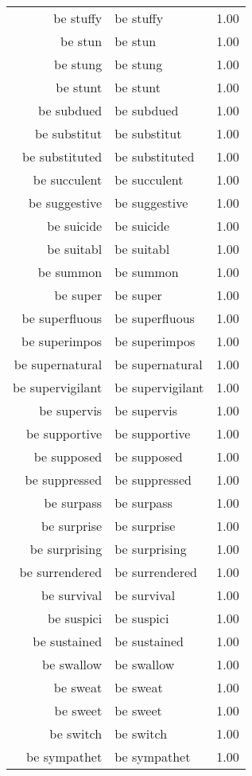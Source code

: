 \begin{table}[ht]
\begin{tabular}{rlr}
  be stuffy & be stuffy & 1.00 \\ 
  be stun & be stun & 1.00 \\ 
  be stung & be stung & 1.00 \\ 
  be stunt & be stunt & 1.00 \\ 
  be subdued & be subdued & 1.00 \\ 
  be substitut & be substitut & 1.00 \\ 
  be substituted & be substituted & 1.00 \\ 
  be succulent & be succulent & 1.00 \\ 
  be suggestive & be suggestive & 1.00 \\ 
  be suicide & be suicide & 1.00 \\ 
  be suitabl & be suitabl & 1.00 \\ 
  be summon & be summon & 1.00 \\ 
  be super & be super & 1.00 \\ 
  be superfluous & be superfluous & 1.00 \\ 
  be superimpos & be superimpos & 1.00 \\ 
  be supernatural & be supernatural & 1.00 \\ 
  be supervigilant & be supervigilant & 1.00 \\ 
  be supervis & be supervis & 1.00 \\ 
  be supportive & be supportive & 1.00 \\ 
  be supposed & be supposed & 1.00 \\ 
  be suppressed & be suppressed & 1.00 \\ 
  be surpass & be surpass & 1.00 \\ 
  be surprise & be surprise & 1.00 \\ 
  be surprising & be surprising & 1.00 \\ 
  be surrendered & be surrendered & 1.00 \\ 
  be survival & be survival & 1.00 \\ 
  be suspici & be suspici & 1.00 \\ 
  be sustained & be sustained & 1.00 \\ 
  be swallow & be swallow & 1.00 \\ 
  be sweat & be sweat & 1.00 \\ 
  be sweet & be sweet & 1.00 \\ 
  be switch & be switch & 1.00 \\ 
  be sympathet & be sympathet & 1.00 \\ 

\end{tabular}
\end{table}
